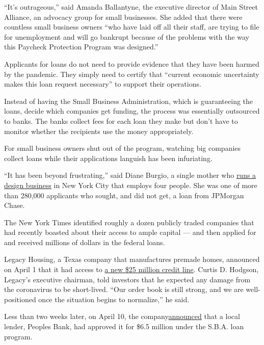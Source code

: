 ``It's outrageous,'' said Amanda Ballantyne, the executive director of
Main Street Alliance, an advocacy group for small businesses. She added
that there were countless small business owners ``who have laid off all
their staff, are trying to file for unemployment and will go bankrupt
because of the problems with the way this Paycheck Protection Program
was designed.''

Applicants for loans do not need to provide evidence that they have been
harmed by the pandemic. They simply need to certify that ``current
economic uncertainty makes this loan request necessary'' to support
their operations.

Instead of having the Small Business Administration, which is
guaranteeing the loans, decide which companies get funding, the process
was essentially outsourced to banks. The banks collect fees for each
loan they make but don't have to monitor whether the recipients use the
money appropriately.

For small business owners shut out of the program, watching big
companies collect loans while their applications languish has been
infuriating.

``It has been beyond frustrating,'' said Diane Burgio, a single mother
who \href{http://dianeburgiodesign.com/}{runs a design business} in New
York City that employs four people. She was one of more than 280,000
applicants who sought, and did not get, a loan from JPMorgan Chase.

The New York Times identified roughly a dozen publicly traded companies
that had recently boasted about their access to ample capital --- and
then applied for and received millions of dollars in the federal loans.

Legacy Housing, a Texas company that manufactures premade homes,
announced on April 1 that it had access to
\href{https://investors.legacyhousingcorp.com/news-releases/news-release-details/legacy-housing-corporation-announces-new-credit-facility}{a
new \$25 million credit line}. Curtis D. Hodgson, Legacy's executive
chairman, told investors that he expected any damage from the
coronavirus to be short-lived. ``Our order book is still strong, and we
are well-positioned once the situation begins to normalize,'' he said.

Less than two weeks later, on April 10, the
company\href{https://www.sec.gov/Archives/edgar/data/1436208/000155837020003911/tmb-20200410x8k.htm}{announced}
that a local lender, Peoples Bank, had approved it for \$6.5 million
under the S.B.A. loan program.

